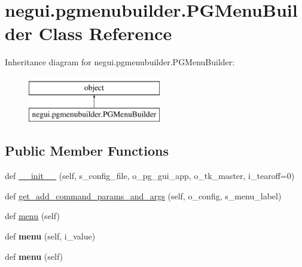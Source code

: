 \hypertarget{classnegui_1_1pgmenubuilder_1_1PGMenuBuilder}{}\section{negui.\+pgmenubuilder.\+P\+G\+Menu\+Builder Class Reference}
\label{classnegui_1_1pgmenubuilder_1_1PGMenuBuilder}
Inheritance diagram for negui.\+pgmenubuilder.\+P\+G\+Menu\+Builder\+:\begin{figure}[H]
\begin{center}
\leavevmode
\includegraphics[height=2.000000cm]{classnegui_1_1pgmenubuilder_1_1PGMenuBuilder}
\end{center}
\end{figure}
\subsection*{Public Member Functions}
\begin{DoxyCompactItemize}
\item 
def \hyperlink{classnegui_1_1pgmenubuilder_1_1PGMenuBuilder_a8e612e54bfe556d763a7150d8d8cbec5}{\+\_\+\+\_\+init\+\_\+\+\_\+} (self, s\+\_\+config\+\_\+file, o\+\_\+pg\+\_\+gui\+\_\+app, o\+\_\+tk\+\_\+master, i\+\_\+tearoff=0)
\item 
def \hyperlink{classnegui_1_1pgmenubuilder_1_1PGMenuBuilder_a564a7629d3ba8ac1666a6f8a046d82f2}{get\+\_\+add\+\_\+command\+\_\+params\+\_\+and\+\_\+args} (self, o\+\_\+config, s\+\_\+menu\+\_\+label)
\item 
def \hyperlink{classnegui_1_1pgmenubuilder_1_1PGMenuBuilder_ae45f68f11cc8fa8c39d8b93a15238c83}{menu} (self)
\item 
def {\bfseries menu} (self, i\+\_\+value)\hypertarget{classnegui_1_1pgmenubuilder_1_1PGMenuBuilder_a286f1b5420d31d737f0680926e4f0fa3}{}\label{classnegui_1_1pgmenubuilder_1_1PGMenuBuilder_a286f1b5420d31d737f0680926e4f0fa3}

\item 
def {\bfseries menu} (self)\hypertarget{classnegui_1_1pgmenubuilder_1_1PGMenuBuilder_ae45f68f11cc8fa8c39d8b93a15238c83}{}\label{classnegui_1_1pgmenubuilder_1_1PGMenuBuilder_ae45f68f11cc8fa8c39d8b93a15238c83}

\end{DoxyCompactItemize}
